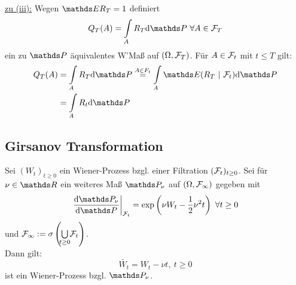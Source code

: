\uline{zu (iii):}
Wegen $\E R_T=1$ definiert
\[
Q_T(A)=\int\ablim{A}R_T\dint\Pw~\forall A\in \F_T
\]
ein zu $\Pw$ äquivalentes W'Maß auf $(\Omega,\mathcal{F}_T)$.
Für $A\in \mathcal{F}_t$ mit $t\le T$ gilt:
\begin{equation*}
\begin{aligned}
	Q_T(A) &= \int\ablim{A}R_T\dint\Pw \stackrel{A\in F_t}{=} \int\ablim{A}\E(R_T~|~\F_t)\dint\Pw\\
	&= \int\ablim{A}R_t\dint\Pw
\end{aligned}
\end{equation*}

\subsection{Girsanov Transformation}
\label{sub:girsanov_transformation}
Sei $(W_t)_{t\ge 0}$ ein Wiener-Prozess bzgl. einer Filtration $(\mathcal{F}_t)_{t\ge0}$.
Sei für $\nu\in \R$ ein weiteres Maß $\Pw_\nu$ auf $(\Omega,\mathcal{F}_\infty)$ gegeben mit
\[
\left.\frac{\dint\Pw_\nu}{\dint \Pw}\right|_{\F_t}=\exp\enbrace{\nu W_t-\frac{1}{2}\nu^2t}~\forall t\ge0
\]
und $\F_\infty:=\sigma\enbrace{\bigcup\ablim{t\ge0}\F_t}$.\\
Dann gilt:
\[
\bar{W}_t=W_t-\nu t,~t\ge 0
\]
ist ein Wiener-Prozess bzgl. $\Pw_\nu$.\\

